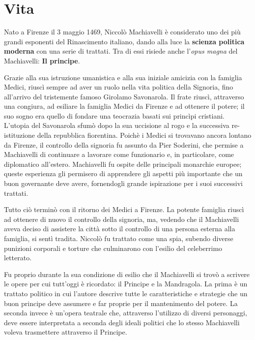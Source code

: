 \documentclass[10pt,a4paper]{report}
\begin{document}
	\section*{Vita}
	
	Nato a Firenze il 3 maggio 1469, Niccolò Machiavelli è considerato uno dei più grandi esponenti del Rinascimento italiano, dando alla luce la \textbf{scienza politica moderna} con una serie di trattati. Tra di essi risiede anche l'\textit{opus magna} del Machiavelli: \textbf{Il principe}.
	
	Grazie alla sua istruzione umanistica e alla sua iniziale amicizia con la famiglia Medici, riuscì sempre ad aver un ruolo nella vita politica della Signoria, fino all'arrivo del tristemente famoso Girolamo Savonarola. Il frate riuscì, attraverso una congiura, ad esiliare la famiglia Medici da Firenze e ad ottenere il potere; il suo sogno era quello di fondare una teocrazia basati sui princìpi cristiani. L'utopia del Savonarola sfumò dopo la sua uccisione al rogo e la successiva re-istituzione della repubblica fiorentina. Poichè i Medici si trovavano ancora lontano da Firenze, il controllo della signoria fu assunto da Pier Soderini, che permise a Machiavelli di continuare a lavorare come funzionario e, in particolare, come diplomatico all'estero. Machiavelli fu ospite delle principali monarchie europee; queste esperienza gli permisero di apprendere gli aspetti più importante che un buon governante deve avere, fornendogli grande ispirazione per i suoi successivi trattati.
	
	Tutto ciò terminò con il ritorno dei Medici a Firenze. La potente famiglia riuscì ad ottenere di nuovo il controllo della signoria, ma, vedendo che il Machiavelli aveva deciso di assistere la città sotto il controllo di una persona esterna alla famiglia, si sentì tradita. Niccolò fu trattato come una spia, subendo diverse punizioni corporali e torture che culminarono con l'esilio del celeberrimo letterato.
	
	Fu proprio durante la sua condizione di esilio che il Machiavelli si trovò a scrivere le opere per cui tutt'oggi è ricordato: il Principe e la Mandragola. La prima è un trattato politico in cui l'autore descrive tutte le caratteristiche e strategie che un buon principe deve assumere e far proprie per il mantenimento del potere. La seconda invece è un'opera teatrale che, attraverso l'utilizzo di diversi personaggi, deve essere interpretata a seconda degli ideali politici  che lo stesso Machiavelli voleva trasmettere attraverso il Principe. 
	
\end{document}
